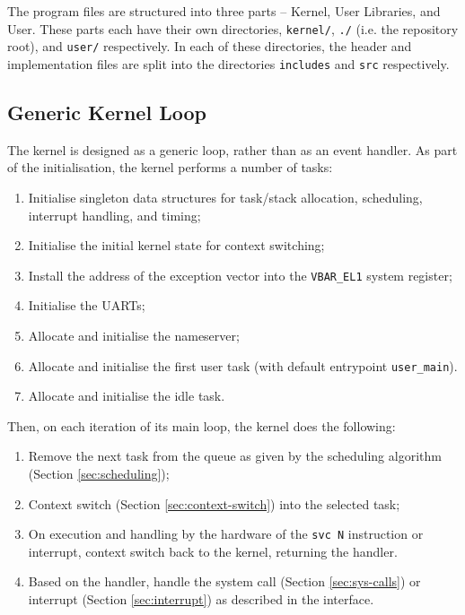 \documentclass[12pt, titlepage]{article}
\begin{document}
    The program files are structured into three parts -- Kernel, User Libraries, and User. These parts each have their own directories, \verb`kernel/`, \verb`./` (i.e. the repository root), and \verb`user/` respectively. In each of these directories, the header and implementation files are split into the directories \verb`includes` and \verb`src` respectively.

    \subsection{Generic Kernel Loop}
    \label{sec:main}

    The kernel is designed as a generic loop, rather than as an event handler. As part of the initialisation, the kernel performs a number of tasks:
    \begin{enumerate}[(1)]
        \item Initialise singleton data structures for task/stack allocation, scheduling, interrupt handling, and timing;
        \item Initialise the initial kernel state for context switching;
        \item Install the address of the exception vector into the \verb`VBAR_EL1` system register;
        \item Initialise the UARTs;
        \item Allocate and initialise the nameserver;
        \item Allocate and initialise the first user task (with default entrypoint \verb`user_main`).
        \item Allocate and initialise the idle task.
    \end{enumerate}

    Then, on each iteration of its main loop, the kernel does the following:
    \begin{enumerate}[(1)]
        \item Remove the next task from the queue as given by the scheduling algorithm (Section \ref{sec:scheduling});
        \item Context switch (Section \ref{sec:context-switch}) into the selected task;
        \item On execution and handling by the hardware of the \verb`svc N` instruction or interrupt, context switch back to the kernel, returning the handler.
        \item Based on the handler, handle the system call (Section \ref{sec:sys-calls}) or interrupt (Section \ref{sec:interrupt}) as described in the interface.
    \end{enumerate}
\end{document}
